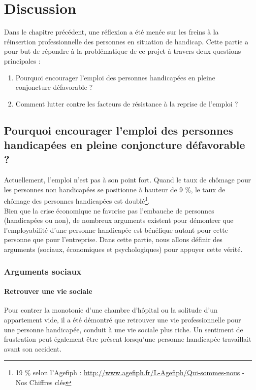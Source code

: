 \chapter{Discussion}

Dans le chapitre précédent, une réflexion a été menée sur les freins à la réinsertion professionnelle des personnes en situation de handicap. Cette partie a pour but de répondre à la problématique de ce projet à travers deux questions principales :
\begin{enumerate}
\item Pourquoi encourager l'emploi des personnes handicapées en pleine conjoncture défavorable ?
\item Comment lutter contre les facteurs de résistance à la reprise de l'emploi ?
\end{enumerate}



\section{Pourquoi encourager l'emploi des personnes handicapées en pleine conjoncture défavorable ?}

Actuellement, l'emploi n'est pas à son point fort. Quand le taux de chômage pour les personnes non handicapées se positionne à hauteur de 9 \%, le taux de chômage des personnes handicapées est doublé\footnote{19 \% selon l'Agefiph : \url{http://www.agefiph.fr/L-Agefiph/Qui-sommes-nous} - Nos Chiffres clés}.\\

Bien que la crise économique ne favorise pas l'embauche de personnes (handicapées ou non), de nombreux arguments existent pour démontrer que l'employabilité d'une personne handicapée est bénéfique autant pour cette personne que pour l'entreprise. Dans cette partie, nous allons définir des arguments (sociaux, économiques et psychologiques) pour appuyer cette vérité.

\subsection{Arguments sociaux}

\subsubsection{Retrouver une vie sociale}
Pour contrer la monotonie d'une chambre d'hôpital ou la solitude d'un appartement vide, il a été démontré que retrouver une vie professionnelle pour une personne handicapée, conduit à une vie sociale plus riche.
Un sentiment de frustration peut également être présent lorsqu'une personne handicapée travaillait avant son accident.\\

